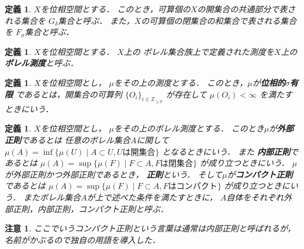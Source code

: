 \documentclass[leqno, a4paper, 12pt]{jsarticle}
\newtheorem{df}[thm]{定義}
\newtheorem*{rmk}{注意}
\newcommand{\zz}{\mathbb{Z}}
\begin{document}
\begin{df}
$X$を位相空間とする．
このとき，可算個の$X$の開集合の共通部分で表される集合を
$G_{\delta}$集合と呼ぶ．
また，$X$の可算個の閉集合の和集合で表される集合を
$F_{\sigma}$集合と呼ぶ．
\end{df}

\begin{df}
$X$を位相空間とする．
$X$上の
ボレル集合族上で定義された測度を$X$上の
\textbf{ボレル測度}と呼ぶ．
\end{df}

\begin{df}
$X$を位相空間とし，
$\mu$をその上の測度とする．
このとき，$\mu$が\textbf{位相的$\sigma$有限}
であるとは，開集合の可算列
$\{O_{i}\}_{i\in \zz_{\ge 0}}$
が存在して
$\mu(O_{i})<\infty$
を満たすときにいう．
\end{df}



\begin{df}
$X$を位相空間とし，
$\mu$をその上のボレル測度とする．
このとき$\mu$が\textbf{外部正則}であるとは
任意のボレル集合$A$に関して
$\mu(A)=\inf\{\mu(U)\mid A\subset U, \text{$U$は開集合}\}$
となるときにいう．
また
\textbf{内部正則}であるとは
$\mu(A)=\sup\{\mu(F)\mid F\subset A, \text{$F$は閉集合}\}$
が成り立つときにいう．
$\mu$が外部正則かつ外部正則であるとき，
\textbf{正則}という．
そして$\mu$が\textbf{コンパクト正則}であるとは
$\mu(A)=\sup\{\mu(F)\mid F\subset A, \text{$F$はコンパクト}\}$
が成り立つときにいう．
またボレル集合$A$が上で述べた条件を満たすときに，
$A$自体をそれぞれ外部正則，内部正則，コンパクト正則と呼ぶ．
\end{df}

\begin{rmk}
ここでいうコンパクト正則という言葉は通常は内部正則と呼ばれるが，名前がかぶるので独自の用語を導入した．
\end{rmk}
\end{document}
